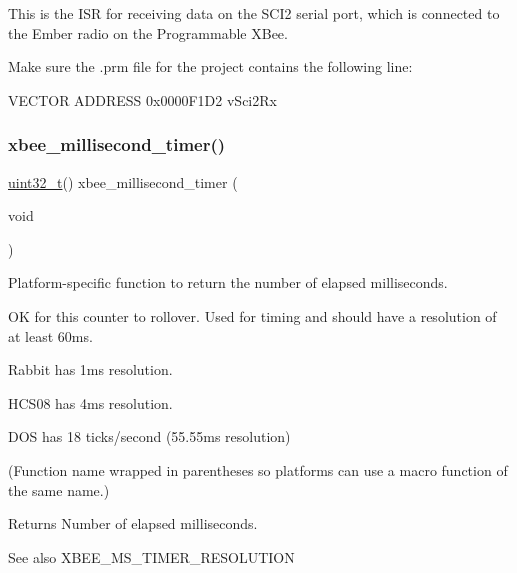 This is the I\+SR for receiving data on the S\+C\+I2 serial port, which is connected to the Ember radio on the Programmable X\+Bee. 

Make sure the .prm file for the project contains the following line\+: 
\begin{DoxyCode}
VECTOR ADDRESS 0x0000F1D2  vSci2Rx
\end{DoxyCode}
 \mbox{\label{group__hal__hcs08_ga22b4e3df788254ca5f8530e9aee58515}} 
\subsubsection{\texorpdfstring{xbee\+\_\+millisecond\+\_\+timer()}{xbee\_millisecond\_timer()}}
{\footnotesize\ttfamily \hyperlink{group__hal__dos_ga09a1e304d66d35dd47daffee9731edaa}{uint32\+\_\+t}() xbee\+\_\+millisecond\+\_\+timer (\begin{DoxyParamCaption}\item[{void}]{ }\end{DoxyParamCaption})}



Platform-\/specific function to return the number of elapsed milliseconds. 

OK for this counter to rollover. Used for timing and should have a resolution of at least 60ms.


\begin{DoxyItemize}
\item Rabbit has 1ms resolution.
\item H\+C\+S08 has 4ms resolution.
\item D\+OS has 18 ticks/second (55.\+55ms resolution)
\end{DoxyItemize}

(Function name wrapped in parentheses so platforms can use a macro function of the same name.)

\begin{DoxyReturn}{Returns}
Number of elapsed milliseconds.
\end{DoxyReturn}
\begin{DoxySeeAlso}{See also}
X\+B\+E\+E\+\_\+\+M\+S\+\_\+\+T\+I\+M\+E\+R\+\_\+\+R\+E\+S\+O\+L\+U\+T\+I\+ON 
\end{DoxySeeAlso}
\mbox{\label{group__hal__hcs08_ga68237f552f0e9a1d548516af35cacbc9}} 
